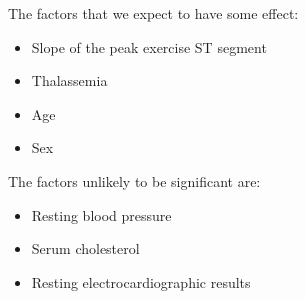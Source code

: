 \documentclass[letter]{article}
\begin{document}
The factors that we expect to have some effect:
\begin{itemize}
	\item Slope of the peak exercise ST segment
	\item Thalassemia
	\item Age
	\item Sex
\end{itemize}
The factors unlikely to be significant are:
\begin{itemize}
	\item Resting blood pressure
	\item Serum cholesterol
	\item Resting electrocardiographic results
\end{itemize}



\end{document}
